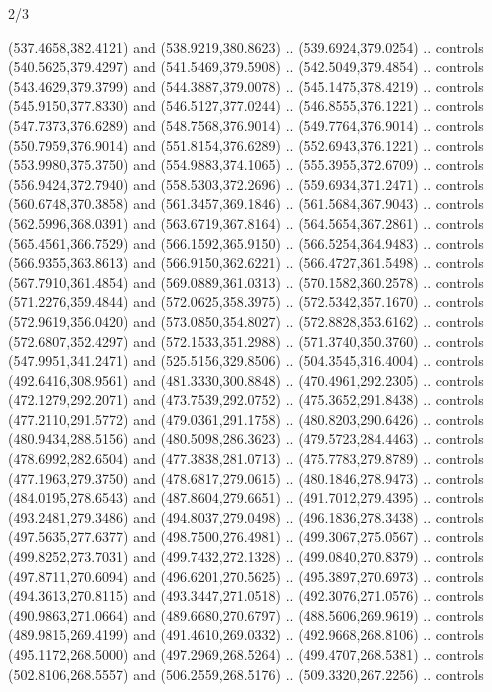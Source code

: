 \begin{flagdescription}{2/3}
\begin{scope}[xshift=0.5\flaglength,yshift=0.5\flagwidth,scale=\flagwidth/562]
\begin{scope}[y=1pt, x=1pt, yscale=-1,shift={(-421.88,-281.25)}]
  (537.4658,382.4121) and (538.9219,380.8623) .. (539.6924,379.0254) .. controls
  (540.5625,379.4297) and (541.5469,379.5908) .. (542.5049,379.4854) .. controls
  (543.4629,379.3799) and (544.3887,379.0078) .. (545.1475,378.4219) .. controls
  (545.9150,377.8330) and (546.5127,377.0244) .. (546.8555,376.1221) .. controls
  (547.7373,376.6289) and (548.7568,376.9014) .. (549.7764,376.9014) .. controls
  (550.7959,376.9014) and (551.8154,376.6289) .. (552.6943,376.1221) .. controls
  (553.9980,375.3750) and (554.9883,374.1065) .. (555.3955,372.6709) .. controls
  (556.9424,372.7940) and (558.5303,372.2696) .. (559.6934,371.2471) .. controls
  (560.6748,370.3858) and (561.3457,369.1846) .. (561.5684,367.9043) .. controls
  (562.5996,368.0391) and (563.6719,367.8164) .. (564.5654,367.2861) .. controls
  (565.4561,366.7529) and (566.1592,365.9150) .. (566.5254,364.9483) .. controls
  (566.9355,363.8613) and (566.9150,362.6221) .. (566.4727,361.5498) .. controls
  (567.7910,361.4854) and (569.0889,361.0313) .. (570.1582,360.2578) .. controls
  (571.2276,359.4844) and (572.0625,358.3975) .. (572.5342,357.1670) .. controls
  (572.9619,356.0420) and (573.0850,354.8027) .. (572.8828,353.6162) .. controls
  (572.6807,352.4297) and (572.1533,351.2988) .. (571.3740,350.3760) .. controls
  (547.9951,341.2471) and (525.5156,329.8506) .. (504.3545,316.4004) .. controls
  (492.6416,308.9561) and (481.3330,300.8848) .. (470.4961,292.2305) .. controls
  (472.1279,292.2071) and (473.7539,292.0752) .. (475.3652,291.8438) .. controls
  (477.2110,291.5772) and (479.0361,291.1758) .. (480.8203,290.6426) .. controls
  (480.9434,288.5156) and (480.5098,286.3623) .. (479.5723,284.4463) .. controls
  (478.6992,282.6504) and (477.3838,281.0713) .. (475.7783,279.8789) .. controls
  (477.1963,279.3750) and (478.6817,279.0615) .. (480.1846,278.9473) .. controls
  (484.0195,278.6543) and (487.8604,279.6651) .. (491.7012,279.4395) .. controls
  (493.2481,279.3486) and (494.8037,279.0498) .. (496.1836,278.3438) .. controls
  (497.5635,277.6377) and (498.7500,276.4981) .. (499.3067,275.0567) .. controls
  (499.8252,273.7031) and (499.7432,272.1328) .. (499.0840,270.8379) .. controls
  (497.8711,270.6094) and (496.6201,270.5625) .. (495.3897,270.6973) .. controls
  (494.3613,270.8115) and (493.3447,271.0518) .. (492.3076,271.0576) .. controls
  (490.9863,271.0664) and (489.6680,270.6797) .. (488.5606,269.9619) .. controls
  (489.9815,269.4199) and (491.4610,269.0332) .. (492.9668,268.8106) .. controls
  (495.1172,268.5000) and (497.2969,268.5264) .. (499.4707,268.5381) .. controls
  (502.8106,268.5557) and (506.2559,268.5176) .. (509.3320,267.2256) .. controls

\end{scope}
\end{scope}
\end{flagdescription}
